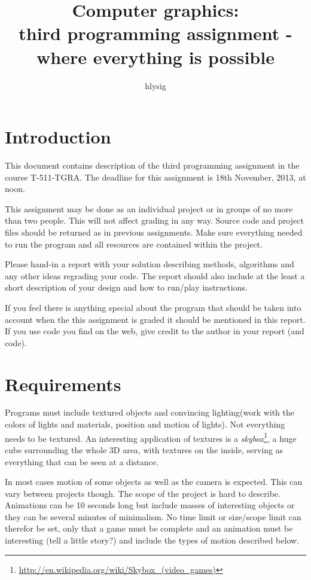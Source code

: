 \documentclass[12pt]{article}
\title{Computer graphics:\\third programming assignment - where everything is possible}
\author{hlysig}
\begin{document}
  \maketitle
\section*{Introduction}
This document contains description of the third programming assignment in the course T-511-TGRA.
The deadline for this assignment is 18th November, 2013, at noon. 

This assignment may be done as an individual project or in groups of no more than two people. This will not affect grading in any way.
Source code and project files should be returned as in previous assignments. Make sure everything needed to run the program and all resources are contained within the project.

Please hand-in a report with your solution describing methods, algorithms and any other ideas regrading your code. The report should also include at the least a short description of your design and how to run/play instructions.

If you feel there is anything special about the program that should be taken into account when the this assignment is graded it should be mentioned in this report. If you use code you find on the web, give credit to the author in your report (and code).


\section*{Requirements}
Programs must include textured objects and convincing lighting(work with the colors of lights and materials, position and motion of lights). Not everything needs to be textured. An interesting application of textures is a \emph{skybox}\footnote{\url{http://en.wikipedia.org/wiki/Skybox_(video_games)}}, a huge cube surrounding the whole 3D area, with textures on the inside, serving as everything that can be seen at a distance.

In most cases motion of some objects as well as the camera is expected. This can vary between projects though.
The scope of the project is hard to describe. Animations can be 10 seconds long but include masses of interesting objects or they can be several minutes of minimalism. No time limit or size/scope limit can therefor be set, only that a game must be complete and an animation must be interesting (tell a little story?) and include the types of motion described below.
\end{document}
